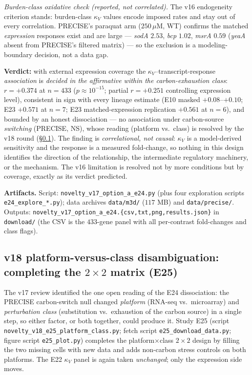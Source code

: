 \documentclass[11pt,a4paper]{article}
\theoremstyle{plain}
\theoremstyle{definition}
\theoremstyle{remark}
\begin{document}
\emph{Burden-class oxidative check (reported, not correlated).} The
v16 endogeneity criterion stands: burden-class $\kappa_V$ values
encode imposed rates and stay out of every correlation. PRECISE's
paraquat arm ($250\,\mu$M, WT) confirms the matched \emph{expression}
responses exist and are large --- \emph{sodA} $2.53$, \emph{bcp}
$1.02$, \emph{msrA} $0.59$ (\emph{yeaA} absent from PRECISE's
filtered matrix) --- so the exclusion is a modeling-boundary
decision, not a data gap.

\textbf{Verdict:} with external expression coverage the
$\kappa_V$--transcript-response \emph{association} is \emph{decided
in the affirmative within the carbon-exhaustion class}: $r = +0.374$
at $n = 433$ ($p \approx 10^{-15}$; partial $r = +0.251$
controlling expression level), consistent in sign with every
lineage estimate (E10 masked $+0.08$--$+0.10$; E23 $+0.571$ at
$n=7$; E23 matched-expression replication $+0.561$ at $n=6$), and
bounded by an honest dissociation --- no association under
carbon-source \emph{switching} (PRECISE, NS), whose reading
(platform vs.\ class) is resolved by the v18 round
(\S\ref{sec:novelty-v18}). The finding is \emph{correlational, not
causal}: $\kappa_V$ is a model-derived sensitivity and the response
is a measured fold-change, so nothing in this design identifies the
direction of the relationship, the intermediate regulatory
machinery, or the mechanism. The v16 limitation is resolved
not by more conditions but by coverage, exactly as its verdict
predicted.

\textbf{Artifacts.} Script:
\texttt{novelty\_v17\_option\_a\_e24.py} (plus four exploration
scripts \texttt{e24\_explore\_*.py}); data archives
\texttt{data/m3d/} ($117$ MB) and \texttt{data/precise/}. Outputs:
\texttt{novelty\_v17\_option\_a\_e24.\{csv,txt,png,results.json\}}
in \texttt{download/} (the CSV is the $433$-gene panel with all
per-contrast fold-changes and class flags).

\subsection{v18 platform-versus-class disambiguation: completing
the \texorpdfstring{$2\times2$}{2x2} matrix (E25)}
\label{sec:novelty-v18}

The v17 review identified the one open reading of the E24
dissociation: the PRECISE carbon-switch null changed
\emph{platform} (RNA-seq vs.\ microarray) and \emph{perturbation
class} (substitution vs.\ exhaustion of the carbon source) in a
single step, so either factor, or both together, could produce it.
Study E25 (script \texttt{novelty\_v18\_e25\_platform\_class.py};
fetch script \texttt{e25\_download\_data.py}; figure script
\texttt{e25\_plot.py}) completes the platform$\times$class
$2\times2$ design by filling the two missing cells with new data
and adds non-carbon stress controls on both platforms. The E22
$\kappa_V$ panel is again taken \emph{unchanged}; only the
expression side moves.
\end{document}
